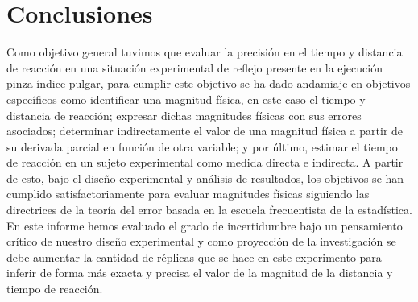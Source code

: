 \documentclass[runningheads]{llncs}
\begin{document}
    \section{Conclusiones}
    Como objetivo general tuvimos que evaluar la precisión en el tiempo y distancia de reacción en una situación experimental de reflejo presente en la ejecución pinza índice-pulgar, para cumplir este objetivo se ha dado andamiaje en 
    objetivos específicos como identificar una magnitud física, en este caso el tiempo y distancia de reacción; expresar dichas magnitudes físicas con sus errores asociados; determinar indirectamente el valor de una magnitud física 
    a partir de su derivada parcial en función de otra variable; y por último, estimar el tiempo de reacción en un sujeto experimental como medida directa e indirecta. A partir de esto, bajo el diseño experimental y análisis de resultados, 
    los objetivos se han cumplido satisfactoriamente para evaluar magnitudes físicas siguiendo las directrices de la teoría del error basada en la escuela frecuentista de la estadística. En este informe hemos evaluado el grado de incertidumbre 
    bajo un pensamiento crítico de nuestro diseño experimental y como proyección de la investigación se debe aumentar la cantidad de réplicas que se hace en este experimento para inferir de forma más exacta y precisa el valor de la magnitud de 
    la distancia y tiempo de reacción. 

\printbibliography
\end{document}
